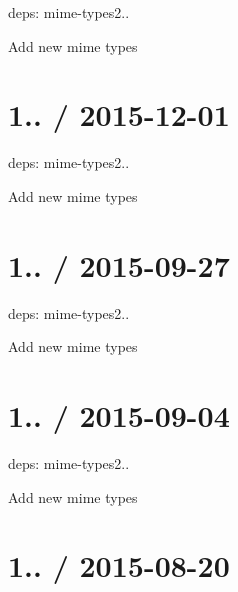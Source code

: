 \begin{DoxyItemize}
\item deps\+: mime-\/types2..
\begin{DoxyItemize}
\item Add new mime types
\end{DoxyItemize}
\end{DoxyItemize}

\section*{1.. / 2015-\/12-\/01 }


\begin{DoxyItemize}
\item deps\+: mime-\/types2..
\begin{DoxyItemize}
\item Add new mime types
\end{DoxyItemize}
\end{DoxyItemize}

\section*{1.. / 2015-\/09-\/27 }


\begin{DoxyItemize}
\item deps\+: mime-\/types2..
\begin{DoxyItemize}
\item Add new mime types
\end{DoxyItemize}
\end{DoxyItemize}

\section*{1.. / 2015-\/09-\/04 }


\begin{DoxyItemize}
\item deps\+: mime-\/types2..
\begin{DoxyItemize}
\item Add new mime types
\end{DoxyItemize}
\end{DoxyItemize}

\section*{1.. / 2015-\/08-\/20 }


